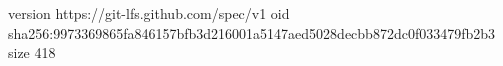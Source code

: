 version https://git-lfs.github.com/spec/v1
oid sha256:9973369865fa846157bfb3d216001a5147aed5028decbb872dc0f033479fb2b3
size 418

